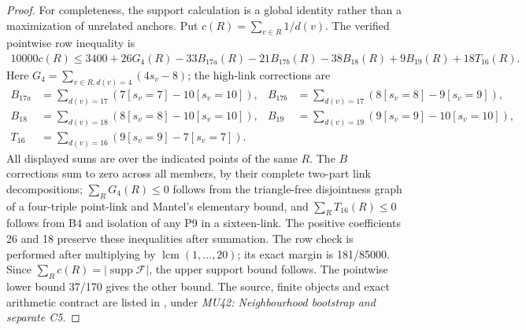 \documentclass[11pt,a4paper]{article}
\numberwithin{equation}{section}
\theoremstyle{remark}
\newcommand{\F}{\mathcal F}
\begin{document}
\begin{proof}
For completeness, the support calculation is a global identity rather
than a maximization of unrelated anchors. Put $ c(R)=\sum_{v\in R}1/d(v)$.
The verified pointwise row inequality is
\begin{align*}
10000c(R)\le 3400+26G_4(R)-33B_{17a}(R)-21B_{17b}(R)
 -38B_{18}(R)+9B_{19}(R)+18T_{16}(R).
\end{align*}
Here $ G_4=\sum_{v\in R,d(v)=4}(4s_v-8)$; the high-link corrections are
\begin{align*}
B_{17a}&=\sum_{d(v)=17}(7[s_v=7]-10[s_v=10]),&
B_{17b}&=\sum_{d(v)=17}(8[s_v=8]-9[s_v=9]),\\
B_{18}&=\sum_{d(v)=18}(8[s_v=8]-10[s_v=10]),&
B_{19}&=\sum_{d(v)=19}(9[s_v=9]-10[s_v=10]),\\
T_{16}&=\sum_{d(v)=16}(9[s_v=9]-7[s_v=7]).
\end{align*}
All displayed sums are over the indicated points of the same $ R $.
The $ B $ corrections sum to zero across all members, by their complete
two-part link decompositions; $\sum_R G_4(R)\le 0$ follows from the
triangle-free disjointness graph of a four-triple point-link and
Mantel's elementary bound, and $\sum_R T_{16}(R)\le 0$ follows from
B4 and isolation of any P9 in a sixteen-link. The positive coefficients
26 and 18 preserve these inequalities after summation. The row check
is performed after multiplying by $\operatorname{lcm}(1,\ldots,20)$;
its exact margin is 181/85000. Since $\sum_R c(R)=|\operatorname{supp}\F|$,
the upper support bound follows. The pointwise lower bound 37/170 gives
the other bound. The source, finite objects and exact arithmetic contract
are listed in , under
\emph{MU42: Neighbourhood bootstrap and separate C5}.
\end{proof}
\end{document}
